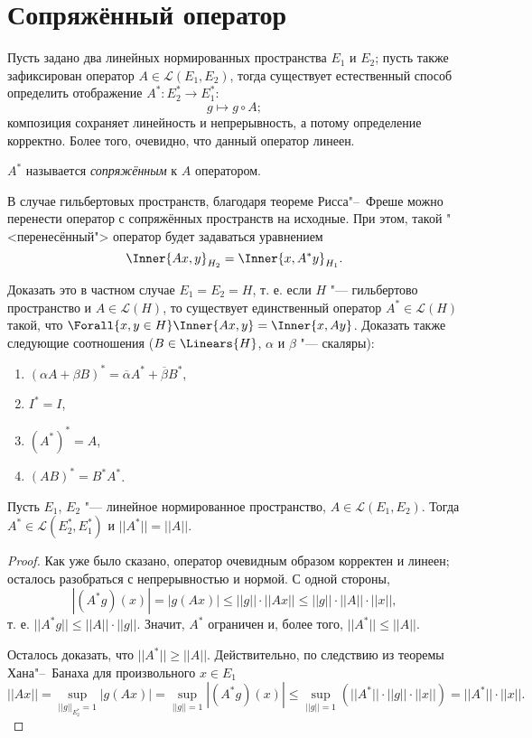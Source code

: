 \documentclass[main]{subfiles}
\begin{document}
\section{Сопряжённый оператор} %

Пусть задано два линейных нормированных пространства
\( E_1 \) и $E_2$;
пусть также зафиксирован оператор $A \in \mathcal{L}(E_1, E_2)$,
тогда существует естественный способ определить
отображение $A^* : E_2^* \to E_1^*$:
\[
  g \mapsto g \circ A;
\]
композиция сохраняет линейность
и непрерывность, а потому определение корректно.
Более того, очевидно, что данный оператор линеен.

\begin{definition}
  \( A^* \) называется \emph{сопряжённым} к \( A \) оператором.
\end{definition}

В случае гильбертовых пространств, благодаря теореме
Рисса"--~Фреше можно перенести оператор с сопряжённых пространств
на исходные. При этом, такой "<перенесённый"> оператор
будет задаваться уравнением
\[
  \Inner{A x, y}_{H_2} = \Inner{x, A^* y}_{H_1}.
\]

\begin{exercise}
  Доказать это в частном случае \( E_1 = E_2 = H \),
  т. е. если \(H \) "--- гильбертово пространство и
  \( A \in \mathcal{L}(H) \), то
  существует единственный оператор
  \( A^* \in \mathcal{L}(H) \) такой,
  что
  \( \Forall{x, y \in H} \Inner{Ax, y} = \Inner{x, Ay} \).
  Доказать также следующие соотношения
  (\( B \in \Linears{H} \),
  \( \alpha \) и \( \beta \) "--- скаляры):
  \begin{enumerate}
    \item $(\alpha A + \beta B)^* = \overline{\alpha} A^* + \overline{\beta} B^*$,
    \item $I^* = I$,
    \item $(A^*)^* = A$,
    \item $(AB)^* = B^* A^*$.
  \end{enumerate}
\end{exercise}

\begin{theorem}%
  Пусть $E_1$, $E_2$ "--- линейное нормированное пространство,
  $A \in \mathcal{L}(E_1, E_2)$.
  Тогда $A^* \in \mathcal{L}(E_2^*, E_1^*)$
  и $||A^*|| = ||A||$.
\end{theorem}
\begin{proof}
  Как уже было сказано, оператор очевидным образом
  корректен и линеен; осталось разобраться
  с непрерывностью и нормой.
  С одной стороны,
  \[
    |(A^* g)(x)| = |g(Ax)| \le
    ||g|| \cdot ||Ax|| \le ||g|| \cdot ||A|| \cdot ||x||,
  \]
  т. е. $||A^* g|| \le ||A|| \cdot ||g||$.
  Значит, $A^*$ ограничен и, более того,
  $||A^*|| \le ||A||$.

  Осталось доказать, что $||A^*|| \ge ||A||$.
  Действительно, по следствию из теоремы Хана"--~Банаха для произвольного $x \in E_1$
  \[
    ||A x|| = \sup_{||g||_{E_2^*} = 1} |g(Ax)| =
    \sup_{||g|| = 1} |(A^* g)(x)| \le
    \sup_{||g|| = 1} \left(||A^*|| \cdot ||g|| \cdot ||x||\right) =
    ||A^*|| \cdot ||x||.
  \]
\end{proof}
\end{document}
